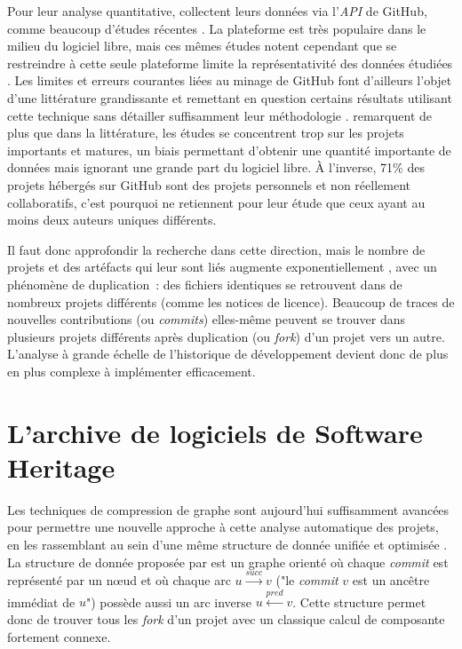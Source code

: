 \documentclass[dvipsnames,runningheads]{llncs}
\newcommand{\en}[1]{\foreignlanguage{english}{\emph{#1}}}
\begin{document}
    Pour leur analyse quantitative, \textcite{signals-2019} collectent leurs données via l'\en{API} de GitHub,
    comme beaucoup d'études récentes \parencite{github-mapping-2017}. La plateforme est très populaire dans le
    milieu du logiciel libre, mais ces mêmes études notent cependant que se restreindre à cette seule
    plateforme limite la représentativité des données étudiées \parencite{swh-growth-2019}. Les limites et
    erreurs courantes liées au minage de GitHub font d'ailleurs l'objet d'une littérature grandissante et
    remettant en question certains résultats utilisant cette technique sans détailler suffisamment leur
    méthodologie \parencite{mining-github-2014,penumbra-oss-2022}. \textcite{barriers-meta-2015} remarquent de
    plus que dans la littérature, les études se concentrent trop sur les projets importants et matures, un
    biais permettant d'obtenir une quantité importante de données mais ignorant une grande part du logiciel
    libre. À l'inverse, 71\% des projets hébergés sur GitHub sont des projets personnels et non réellement
    collaboratifs, c'est pourquoi \textcite{mining-github-2014} ne retiennent pour leur étude que ceux ayant
    au moins deux auteurs uniques différents.

    Il faut donc approfondir la recherche dans cette direction, mais le nombre de projets et des artéfacts qui
    leur sont liés augmente exponentiellement \parencite{swh-growth-2019}, avec un phénomène de duplication :
    des fichiers identiques se retrouvent dans de nombreux projets différents (comme les notices de licence).
    Beaucoup de traces de nouvelles contributions (ou \en{commits}) elles-même peuvent se trouver dans
    plusieurs projets différents après duplication (ou \en{fork}) d'un projet vers un autre. L'analyse à
    grande échelle de l'historique de développement devient donc de plus en plus complexe à implémenter
    efficacement.

    \section{L'archive de logiciels de Software Heritage}

    \label{ssec:swh-graph}

    Les techniques de compression de graphe sont aujourd'hui suffisamment avancées pour permettre une nouvelle
    approche à cette analyse automatique des projets, en les rassemblant au sein d'une même structure de
    donnée unifiée et optimisée \parencite{swh-graph-2020}. La structure de donnée proposée par
    \textcite{swh-graph-2020} est un graphe orienté où chaque \en{commit} est représenté par un nœud et où
    chaque arc $u \xrightarrow{succ} v$ ("le \en{commit} $v$ est un ancêtre immédiat de $u$") possède aussi un
    arc inverse $u \xleftarrow{pred} v$. Cette structure permet donc de trouver tous les \en{fork} d'un
    projet avec un classique calcul de composante fortement connexe.
\end{document}
